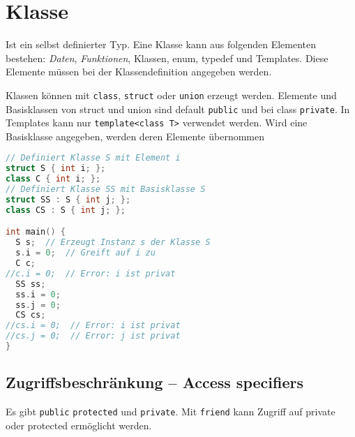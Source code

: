 \section{Klasse}

Ist ein selbst definierter Typ. Eine Klasse kann aus folgenden Elementen
bestehen: \emph{Daten}, \emph{Funktionen}, Klassen, enum, typedef und Templates.
Diese Elemente müssen bei der Klassendefinition angegeben werden.

Klassen können mit \lstinline|class|, \lstinline|struct| oder \lstinline|union|
erzeugt werden. Elemente und Basisklassen von struct und union sind default
\lstinline|public| und bei class \lstinline|private|. In Templates kann nur
\lstinline|template<class T>| verwendet werden. Wird eine Basisklasse angegeben,
werden deren Elemente übernommen

\begin{lstlisting}[language=C++]
// Definiert Klasse S mit Element i
struct S { int i; };
class C { int i; };
// Definiert Klasse SS mit Basisklasse S
struct SS : S { int j; };
class CS : S { int j; };

int main() {
  S s;  // Erzeugt Instanz s der Klasse S
  s.i = 0;  // Greift auf i zu
  C c;
//c.i = 0;  // Error: i ist privat
  SS ss;
  ss.i = 0;
  ss.j = 0;
  CS cs;
//cs.i = 0;  // Error: i ist privat
//cs.j = 0;  // Error: j ist privat
}
\end{lstlisting}

\subsection{Zugriffsbeschränkung -- Access specifiers}

Es gibt \lstinline|public| \lstinline|protected| und \lstinline|private|. Mit
\lstinline|friend| kann Zugriff auf private oder protected ermöglicht werden.

